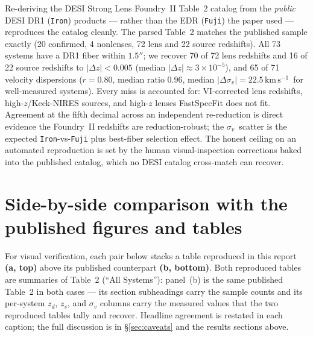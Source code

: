 \documentclass[11pt,letterpaper]{article}
\newcommand{\sigmav}{\ensuremath{\sigma_v}}
\newcommand{\zd}{\ensuremath{z_d}}
\newcommand{\zs}{\ensuremath{z_s}}
\newcommand{\dz}{\ensuremath{\Delta z}}
\newcommand{\kms}{\ensuremath{\mathrm{km\,s^{-1}}}}
\begin{document}
Re-deriving the DESI Strong Lens Foundry~II \citep{huang2025foundry2} Table~2
catalog from the \emph{public} DESI DR1 (\texttt{Iron}) products --- rather than
the EDR (\texttt{Fuji}) the paper used --- reproduces the catalog cleanly. The
parsed Table~2 matches the published sample exactly (20 confirmed, 4 nonlenses,
72 lens and 22 source redshifts). All 73 systems have a DR1 fiber within
$1.5''$; we recover 70 of 72 lens redshifts and 16 of 22 source redshifts to
$|\dz|<0.005$ (median $|\dz|\approx3\times10^{-5}$), and 65 of 71 velocity
dispersions ($r=0.80$, median ratio $0.96$, median $|\Delta\sigmav|=22.5\,$\kms\
for well-measured systems). Every miss is accounted for: VI-corrected lens
redshifts, high-$z$/Keck-NIRES sources, and high-$z$ lenses FastSpecFit does not
fit. Agreement at the fifth decimal across an independent re-reduction is direct
evidence the Foundry~II redshifts are reduction-robust; the \sigmav\ scatter is
the expected \texttt{Iron}-vs-\texttt{Fuji} plus best-fiber selection effect.
The honest ceiling on an automated reproduction is set by the human
visual-inspection corrections baked into the published catalog, which no DESI
catalog cross-match can recover.

\clearpage
\appendix
\section{Side-by-side comparison with the published figures and tables}
\label{app:compare}

For visual verification, each pair below stacks a table reproduced in this
report \textbf{(a, top)} above its published counterpart \textbf{(b, bottom)}.
Both reproduced tables are summaries of \citet{huang2025foundry2} Table~2 (``All
Systems''): panel~(b) is the same published Table~2 in both cases --- its
section subheadings carry the sample counts and its per-system $\zd$, $\zs$, and
$\sigmav$ columns carry the measured values that the two reproduced tables tally
and recover. Headline agreement is restated in each caption; the full discussion
is in \S\ref{sec:caveats} and the results sections above.
\end{document}
